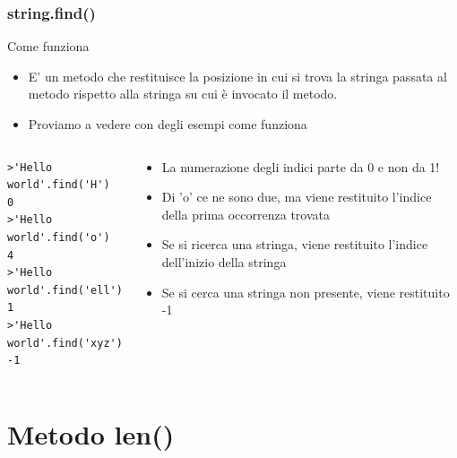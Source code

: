 \documentclass{beamer}
\begin{document}
\begin{frame}[fragile]
\frametitle{string.find()}
\begin{block}{Come funziona}
	\begin{itemize}
		\item E' un metodo che restituisce la posizione in cui si trova la stringa passata al metodo rispetto alla stringa su cui è invocato il metodo.
		\item Proviamo a vedere con degli esempi come funziona
	\end{itemize}
\end{block}
\begin{columns}
	\begin{column}[T]{0.53\textwidth}
		\begin{lstlisting}
>'Hello world'.find('H')
0
>'Hello world'.find('o')
4
>'Hello world'.find('ell')
1
>'Hello world'.find('xyz')
-1
		\end{lstlisting}
	\end{column}
	\begin{column}[T]{0.47\textwidth}
		\begin{itemize}
			\item La numerazione degli indici parte da 0 e non da 1!
			\item Di 'o' ce ne sono due, ma viene restituito l'indice della prima occorrenza trovata
			\item Se si ricerca una stringa, viene restituito l'indice dell'inizio della stringa
			\item Se si cerca una stringa non presente, viene restituito -1
		\end{itemize}
	\end{column}
\end{columns}

\end{frame}

\section{Metodo len()}
\end{document}
